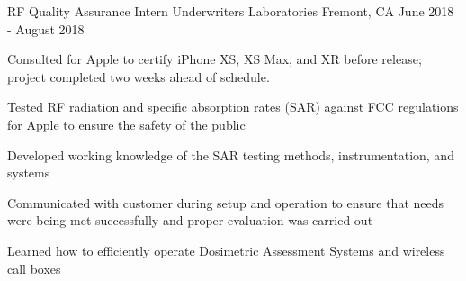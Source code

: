 \begin{cventries}
  \cventry
  {RF Quality Assurance Intern \textcolor{lightgray}{} } %
  {Underwriters Laboratories} %
  {Fremont, CA} %
  {June 2018 - August 2018} %
  {
  \begin{cvitems} %
    \item {Consulted for Apple to certify iPhone XS, XS Max, and XR before release; project completed two weeks ahead of schedule.}
    \item {Tested RF radiation and specific absorption rates (SAR) against FCC regulations for Apple to ensure the safety of the public}
    \item {Developed working knowledge of the SAR testing methods, instrumentation, and systems }
    \item {Communicated with customer during setup and operation to ensure that needs were being met successfully and proper evaluation was carried out}
    \item {Learned how to efficiently operate Dosimetric Assessment Systems and wireless call boxes}
  \end{cvitems}
  }
\end{cventries}
